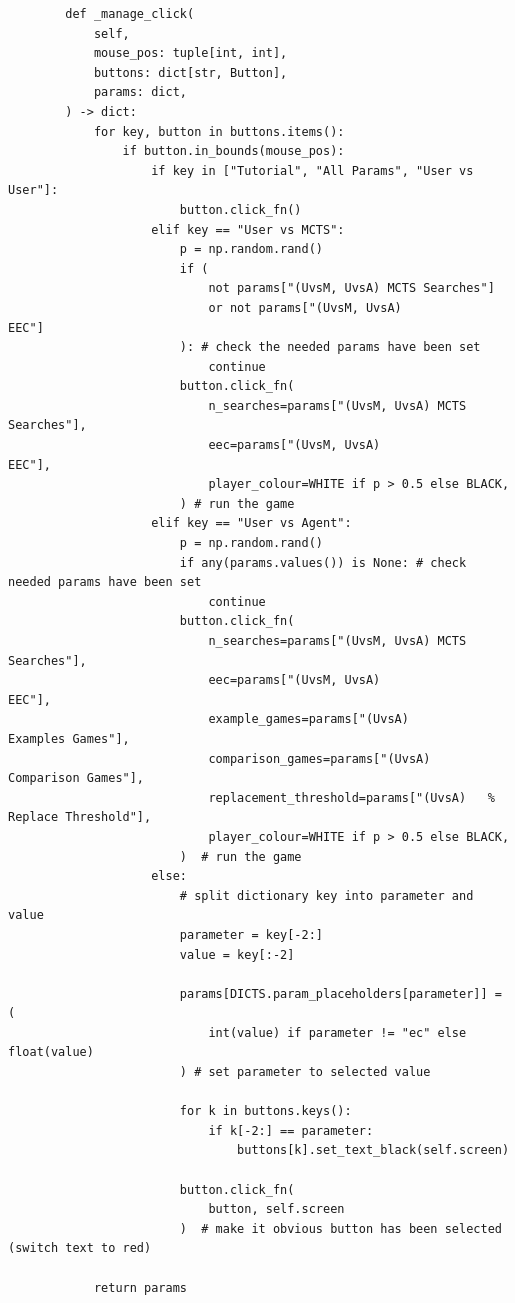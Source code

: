 \documentclass{article}
\begin{document}
\begin{verbatim}
        def _manage_click(
            self,
            mouse_pos: tuple[int, int],
            buttons: dict[str, Button],
            params: dict,
        ) -> dict:
            for key, button in buttons.items():
                if button.in_bounds(mouse_pos):
                    if key in ["Tutorial", "All Params", "User vs User"]:
                        button.click_fn()
                    elif key == "User vs MCTS":
                        p = np.random.rand()
                        if (
                            not params["(UvsM, UvsA) MCTS Searches"]
                            or not params["(UvsM, UvsA)                     EEC"]
                        ): # check the needed params have been set
                            continue
                        button.click_fn(
                            n_searches=params["(UvsM, UvsA) MCTS Searches"],
                            eec=params["(UvsM, UvsA)                     EEC"],
                            player_colour=WHITE if p > 0.5 else BLACK,
                        ) # run the game
                    elif key == "User vs Agent":
                        p = np.random.rand()
                        if any(params.values()) is None: # check needed params have been set
                            continue
                        button.click_fn(
                            n_searches=params["(UvsM, UvsA) MCTS Searches"],
                            eec=params["(UvsM, UvsA)                     EEC"],
                            example_games=params["(UvsA)       Examples Games"],
                            comparison_games=params["(UvsA)     Comparison Games"],
                            replacement_threshold=params["(UvsA)   % Replace Threshold"],
                            player_colour=WHITE if p > 0.5 else BLACK,
                        )  # run the game
                    else:
                        # split dictionary key into parameter and value
                        parameter = key[-2:]
                        value = key[:-2]

                        params[DICTS.param_placeholders[parameter]] = (
                            int(value) if parameter != "ec" else float(value)
                        ) # set parameter to selected value

                        for k in buttons.keys():
                            if k[-2:] == parameter:
                                buttons[k].set_text_black(self.screen)

                        button.click_fn(
                            button, self.screen
                        )  # make it obvious button has been selected (switch text to red)

            return params
    \end{verbatim}
\end{document}
